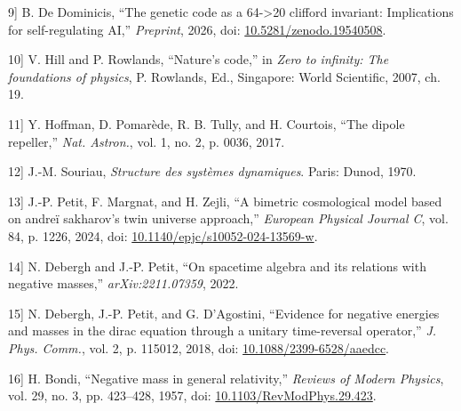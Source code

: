 \documentclass[11pt]{article}
\newlength{\cslhangindent}
\newenvironment{CSLReferences}[2]%
{\par
\noindent\setlength{\parindent}{0pt}}%
{\par}
\newcommand{\CSLLeftMargin}[1]{\hspace*{\cslhangindent}#1}
\newcommand{\CSLRightInline}[1]{#1}
\begin{document}
\begin{CSLReferences}{0}{0}
\leavevmode{}%
\CSLLeftMargin{{[}9{]} }
\CSLRightInline{B. De Dominicis, {``The genetic code as a
64-\textgreater20 clifford invariant: Implications for self-regulating
AI,''} \emph{Preprint}, 2026, doi:
\href{https://doi.org/10.5281/zenodo.19540508}{10.5281/zenodo.19540508}.}

\leavevmode{}%
\CSLLeftMargin{{[}10{]} }
\CSLRightInline{V. Hill and P. Rowlands, {``Nature's code,''} in
\emph{Zero to infinity: The foundations of physics}, P. Rowlands, Ed.,
Singapore: World Scientific, 2007, ch. 19.}

\leavevmode{}%
\CSLLeftMargin{{[}11{]} }
\CSLRightInline{Y. Hoffman, D. Pomarède, R. B. Tully, and H. Courtois,
{``The dipole repeller,''} \emph{Nat. Astron.}, vol. 1, no. 2, p. 0036,
2017.}

\leavevmode{}%
\CSLLeftMargin{{[}12{]} }
\CSLRightInline{J.-M. Souriau, \emph{Structure des systèmes dynamiques}.
Paris: Dunod, 1970.}

\leavevmode{}%
\CSLLeftMargin{{[}13{]} }
\CSLRightInline{J.-P. Petit, F. Margnat, and H. Zejli, {``A bimetric
cosmological model based on andreï sakharov's twin universe approach,''}
\emph{European Physical Journal C}, vol. 84, p. 1226, 2024, doi:
\href{https://doi.org/10.1140/epjc/s10052-024-13569-w}{10.1140/epjc/s10052-024-13569-w}.}

\leavevmode{}%
\CSLLeftMargin{{[}14{]} }
\CSLRightInline{N. Debergh and J.-P. Petit, {``On spacetime algebra and
its relations with negative masses,''} \emph{arXiv:2211.07359}, 2022.}

\leavevmode{}%
\CSLLeftMargin{{[}15{]} }
\CSLRightInline{N. Debergh, J.-P. Petit, and G. D'Agostini, {``Evidence
for negative energies and masses in the dirac equation through a unitary
time-reversal operator,''} \emph{J. Phys. Comm.}, vol. 2, p. 115012,
2018, doi:
\href{https://doi.org/10.1088/2399-6528/aaedcc}{10.1088/2399-6528/aaedcc}.}

\leavevmode{}%
\CSLLeftMargin{{[}16{]} }
\CSLRightInline{H. Bondi, {``Negative mass in general relativity,''}
\emph{Reviews of Modern Physics}, vol. 29, no. 3, pp. 423--428, 1957,
doi:
\href{https://doi.org/10.1103/RevModPhys.29.423}{10.1103/RevModPhys.29.423}.}


\end{CSLReferences}
\end{document}
